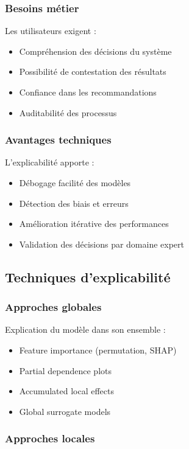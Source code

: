 \documentclass[12pt,a4paper]{report}
\begin{document}
\subsubsection{Besoins métier}

Les utilisateurs exigent :
\begin{itemize}
\item Compréhension des décisions du système
\item Possibilité de contestation des résultats
\item Confiance dans les recommandations
\item Auditabilité des processus
\end{itemize}

\subsubsection{Avantages techniques}

L'explicabilité apporte :
\begin{itemize}
\item Débogage facilité des modèles
\item Détection des biais et erreurs
\item Amélioration itérative des performances
\item Validation des décisions par domaine expert
\end{itemize}

\subsection{Techniques d'explicabilité}

\subsubsection{Approches globales}

Explication du modèle dans son ensemble :
\begin{itemize}
\item Feature importance (permutation, SHAP)
\item Partial dependence plots
\item Accumulated local effects
\item Global surrogate models
\end{itemize}

\subsubsection{Approches locales}
\end{document}
